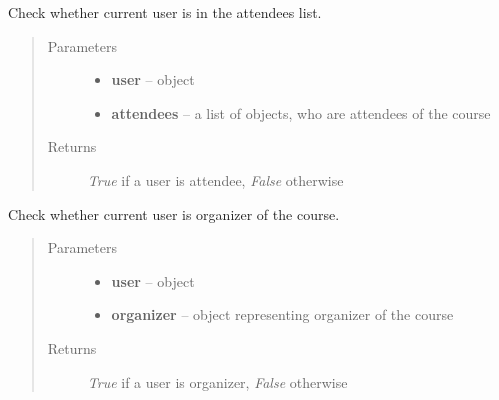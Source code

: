 \documentclass[letterpaper,10pt,english]{sphinxmanual}
\begin{document}
\begin{fulllineitems}
\label{web_portal:core.courses.utils.user_is_attendee}
Check whether current user is in the attendees list.
\begin{quote}\begin{description}
\item[{Parameters}] \leavevmode\begin{itemize}
\item {} 
\textbf{user} --  object

\item {} 
\textbf{attendees} -- a list of  objects, who are attendees of the course

\end{itemize}

\item[{Returns}] \leavevmode
\emph{True} if a user is attendee, \emph{False} otherwise

\end{description}\end{quote}

\end{fulllineitems}


\begin{fulllineitems}
\label{web_portal:core.courses.utils.user_is_organizer}
Check whether current user is organizer of the course.
\begin{quote}\begin{description}
\item[{Parameters}] \leavevmode\begin{itemize}
\item {} 
\textbf{user} --  object

\item {} 
\textbf{organizer} --  object representing organizer of the course

\end{itemize}

\item[{Returns}] \leavevmode
\emph{True} if a user is organizer, \emph{False} otherwise

\end{description}\end{quote}

\end{fulllineitems}
\end{document}
